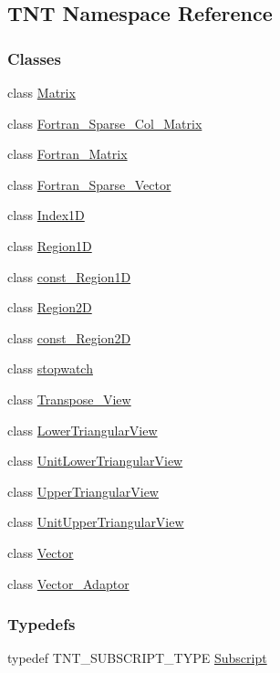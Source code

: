 \subsection{TNT Namespace Reference}
\label{namespace_t_n_t}
\subsubsection*{Classes}
\begin{DoxyCompactItemize}
\item 
class \hyperlink{class_t_n_t_1_1_matrix}{Matrix}
\item 
class \hyperlink{class_t_n_t_1_1_fortran___sparse___col___matrix}{Fortran\_\-Sparse\_\-Col\_\-Matrix}
\item 
class \hyperlink{class_t_n_t_1_1_fortran___matrix}{Fortran\_\-Matrix}
\item 
class \hyperlink{class_t_n_t_1_1_fortran___sparse___vector}{Fortran\_\-Sparse\_\-Vector}
\item 
class \hyperlink{class_t_n_t_1_1_index1_d}{Index1D}
\item 
class \hyperlink{class_t_n_t_1_1_region1_d}{Region1D}
\item 
class \hyperlink{class_t_n_t_1_1const___region1_d}{const\_\-Region1D}
\item 
class \hyperlink{class_t_n_t_1_1_region2_d}{Region2D}
\item 
class \hyperlink{class_t_n_t_1_1const___region2_d}{const\_\-Region2D}
\item 
class \hyperlink{class_t_n_t_1_1stopwatch}{stopwatch}
\item 
class \hyperlink{class_t_n_t_1_1_transpose___view}{Transpose\_\-View}
\item 
class \hyperlink{class_t_n_t_1_1_lower_triangular_view}{LowerTriangularView}
\item 
class \hyperlink{class_t_n_t_1_1_unit_lower_triangular_view}{UnitLowerTriangularView}
\item 
class \hyperlink{class_t_n_t_1_1_upper_triangular_view}{UpperTriangularView}
\item 
class \hyperlink{class_t_n_t_1_1_unit_upper_triangular_view}{UnitUpperTriangularView}
\item 
class \hyperlink{class_t_n_t_1_1_vector}{Vector}
\item 
class \hyperlink{class_t_n_t_1_1_vector___adaptor}{Vector\_\-Adaptor}
\end{DoxyCompactItemize}
\subsubsection*{Typedefs}
\begin{DoxyCompactItemize}
\item 
typedef TNT\_\-SUBSCRIPT\_\-TYPE \hyperlink{namespace_t_n_t_af22e3f1460e145c04ce4e7d701e4c1c1}{Subscript}
\end{DoxyCompactItemize}
